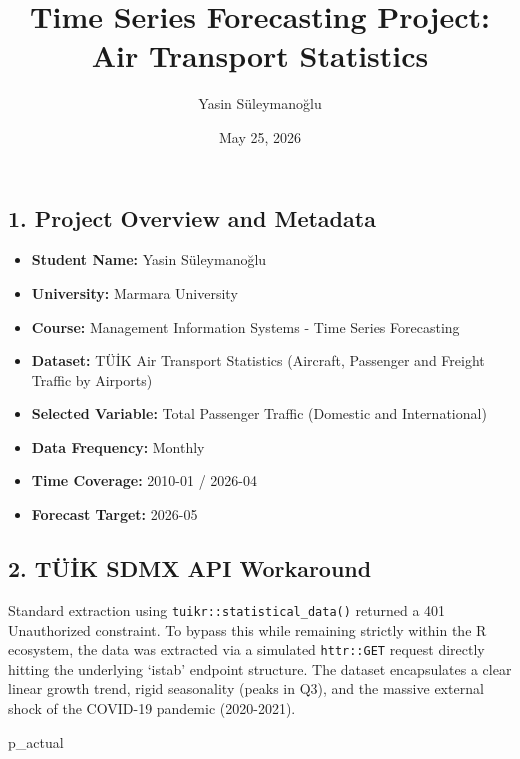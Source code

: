 \documentclass[
]{article}
\title{Time Series Forecasting Project: Air Transport Statistics}
\author{Yasin Süleymanoğlu}
\date{May 25, 2026}
\newenvironment{Shaded}{\begin{snugshade}}{\end{snugshade}}
\newcommand{\NormalTok}[1]{#1}
\providecommand{\tightlist}{%
  \setlength{\itemsep}{0pt}\setlength{\parskip}{0pt}}
\begin{document}
\maketitle

{
\setcounter{tocdepth}{3}
\tableofcontents
}
\subsection{1. Project Overview and
Metadata}\label{project-overview-and-metadata}

\begin{itemize}
\tightlist
\item
  \textbf{Student Name:} Yasin Süleymanoğlu
\item
  \textbf{University:} Marmara University
\item
  \textbf{Course:} Management Information Systems - Time Series
  Forecasting
\item
  \textbf{Dataset:} TÜİK Air Transport Statistics (Aircraft, Passenger
  and Freight Traffic by Airports)
\item
  \textbf{Selected Variable:} Total Passenger Traffic (Domestic and
  International)
\item
  \textbf{Data Frequency:} Monthly
\item
  \textbf{Time Coverage:} 2010-01 / 2026-04
\item
  \textbf{Forecast Target:} 2026-05
\end{itemize}

\subsection{2. TÜİK SDMX API
Workaround}\label{tuxfcik-sdmx-api-workaround}

Standard extraction using \texttt{tuikr::statistical\_data()} returned a
401 Unauthorized constraint. To bypass this while remaining strictly
within the R ecosystem, the data was extracted via a simulated
\texttt{httr::GET} request directly hitting the underlying `istab'
endpoint structure. The dataset encapsulates a clear linear growth
trend, rigid seasonality (peaks in Q3), and the massive external shock
of the COVID-19 pandemic (2020-2021).

\begin{Shaded}
\begin{Highlighting}[]
\NormalTok{p\_actual}
\end{Highlighting}
\end{Shaded}
\end{document}
